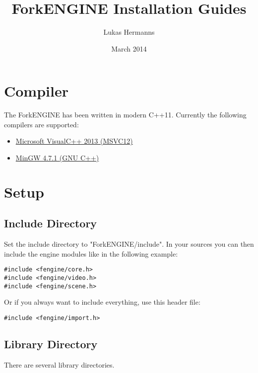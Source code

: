 \documentclass{article}
\title{ForkENGINE Installation Guides}
\author{Lukas Hermanns}
\date{March 2014}
\begin{document}


\maketitle

\section{Compiler}
The ForkENGINE has been written in modern C++11. Currently the following compilers are supported:

\begin{itemize}

\item
\href{http://www.microsoft.com/en-us/download/details.aspx?id=40787}{Microsoft VisualC++ 2013 (MSVC12)}

\item
\href{http://www.mingw.org/}{MinGW 4.7.1 (GNU C++)}

\end{itemize}

\section{Setup}

\subsection{Include Directory}
Set the include directory to "ForkENGINE/include".
In your sources you can then include the engine modules like in the following example:

\begin{lstlisting}
#include <fengine/core.h>
#include <fengine/video.h>
#include <fengine/scene.h>
\end{lstlisting}

Or if you always want to include everything, use this header file:

\begin{lstlisting}
#include <fengine/import.h>
\end{lstlisting}

\subsection{Library Directory}
There are several library directories.
\end{document}
